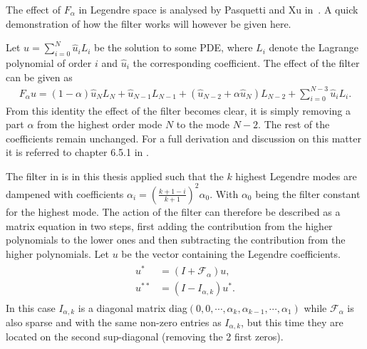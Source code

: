 The effect of $F_{\alpha}$ in Legendre space is analysed
by Pasquetti and Xu in~\cite{Pasquetti}. A quick demonstration of 
how the filter works will however be given here. 

Let $u = \sum_{i=0}^{N} \hat{u}_i L_i$ be the solution to some PDE, where $L_i$ denote the Lagrange
polynomial of order $i$ and $\hat{u}_i$ the corresponding coefficient. The effect of the filter
can be given as 
%
\begin{align}
    F_{\alpha} u = 
    (1-\alpha)\hat{u}_{N}L_{N}
    +\hat{u}_{N-1}L_{N-1} +
    (\hat{u}_{N-2}+\alpha \hat{u}_{N})L_{N-2}
    +\sum_{i=0}^{N-3}\hat{u}_{i}L_{i}.
    \label{eq:filtereffect}
\end{align}
%
From this identity the effect of the filter becomes clear, it is simply removing a part $\alpha $
from the highest order mode $N$ to the mode $N-2$. The rest of the coefficients remain unchanged.
For a full derivation and discussion on this matter it is referred to chapter 6.5.1 in 
\cite{Karniadakis}.

The filter in  is in this thesis applied such that the $k$ highest Legendre modes
are dampened with coefficients $\alpha_i = (\frac{k+1-i}{k+1})^2\alpha_0 $. With $\alpha_0$ being the filter constant
for the highest mode. The action of the filter can therefore be described as 
a matrix equation in two steps, first adding the contribution from the higher polynomials to the 
lower ones and then subtracting the contribution from the higher polynomials. Let $u$ be the 
vector containing the Legendre coefficients.
\begin{align}
    \begin{split}
    u^* &=(I+\mathcal{F}_{\alpha})u, \\
    u^{**} &= (I-I_{\alpha,k})u^*.
    \end{split}
    \label{eq:filterstepwise}
\end{align}
In this case $I_{\alpha,k}$ is a diagonal matrix 
diag$(0,0,\cdots,\alpha_k,\alpha_{k-1},\cdots,\alpha_1)$ 
while $\mathcal{F}_{\alpha}$ is also sparse and with the same non-zero entries as $I_{\alpha,k}$,
but this time they are located on the second sup-diagonal (removing the 2 first zeros). 

